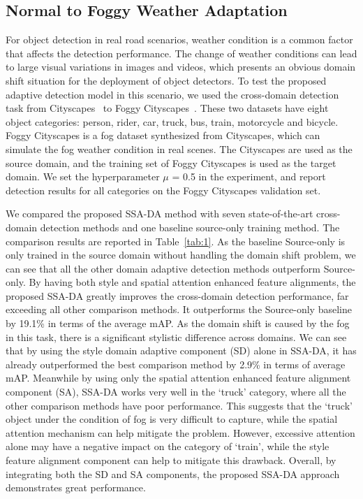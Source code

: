 \documentclass[runningheads]{llncs}
\begin{document}
\subsection{Normal to Foggy Weather Adaptation}\label{section:4.2}

For object detection in real road scenarios, weather condition is a common factor that affects the detection performance. 
The change of weather conditions can lead to large visual variations in images and videos, 
which presents an obvious domain shift situation for the deployment of object detectors. 
To test the proposed adaptive detection model in this scenario, 
we used the cross-domain detection task from
Cityscapes~\cite{cordts2016cityscapes} 
to Foggy Cityscapes~\cite{sakaridis2018semantic}. 
These two datasets have eight object categories:
person, rider, car, truck, bus, train, motorcycle and bicycle. 
Foggy Cityscapes is a fog dataset synthesized from Cityscapes,
which can simulate the fog weather condition in real scenes. 
The Cityscapes are used as the source domain, and the training set of Foggy Cityscapes is used as the target domain. 
We set the hyperparameter  $\mu$ = 0.5 in the experiment, and report detection results for all categories on the Foggy Cityscapes validation set.

We compared the proposed SSA-DA method with seven state-of-the-art cross-domain detection methods and one baseline source-only training method.
The comparison results are reported in Table~\ref{tab:1}. 
As the baseline Source-only is only trained in the source domain without handling the domain shift problem,
we can see that all the other domain adaptive detection methods outperform Source-only. 
By having both style and spatial attention enhanced feature alignments,
the proposed SSA-DA greatly improves the cross-domain detection performance, 
far exceeding all other comparison methods. 
It outperforms the Source-only baseline by 19.1\% in terms of the average mAP. 
As the domain shift is caused by the fog  in this task,
there is a significant stylistic difference across domains. 
We can see that by using the style domain adaptive component (SD) alone in SSA-DA, 
it has already outperformed the best comparison method by 2.9\% in terms of average mAP. 
Meanwhile 
by using only the spatial attention enhanced feature alignment component (SA),
SSA-DA works very well in the `truck' category, where all the other comparison methods have poor performance. 
This suggests that the `truck' object under the condition of fog is very difficult to capture, 
while the spatial attention mechanism can help mitigate the problem.
However, excessive attention alone may have a negative impact on the category of `train', 
while the style feature alignment component can help to mitigate this drawback. 
Overall, by integrating both the SD and SA components, the proposed SSA-DA approach demonstrates great performance.  
\end{document}
